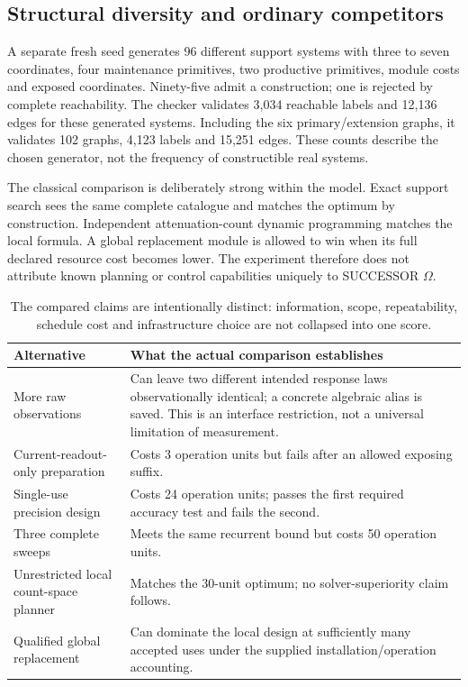 \documentclass[11pt,letterpaper]{article}
\theoremstyle{definition}\newtheorem{definition}[theorem]{Definition}
\theoremstyle{remark}\newtheorem{remark}[theorem]{Remark}
\newcommand{\Om}{SUCCESSOR $\Omega$}
\begin{document}
\subsection{Structural diversity and ordinary competitors}
A separate fresh seed generates 96 different support systems with three to seven coordinates, four maintenance primitives, two productive primitives, module costs and exposed coordinates. Ninety-five admit a construction; one is rejected by complete reachability. The checker validates 3,034 reachable labels and 12,136 edges for these generated systems. Including the six primary/extension graphs, it validates 102 graphs, 4,123 labels and 15,251 edges. These counts describe the chosen generator, not the frequency of constructible real systems.

The classical comparison is deliberately strong within the model. Exact support search sees the same complete catalogue and matches the optimum by construction. Independent attenuation-count dynamic programming matches the local formula. A global replacement module is allowed to win when its full declared resource cost becomes lower. The experiment therefore does not attribute known planning or control capabilities uniquely to \Om.

\begin{table}[htbp]
\centering\small
\begin{tabularx}{\linewidth}{P{3.8cm}Y}
\toprule
Alternative & What the actual comparison establishes\\
\midrule
More raw observations & Can leave two different intended response laws observationally identical; a concrete algebraic alias is saved. This is an interface restriction, not a universal limitation of measurement.\\
Current-readout-only preparation & Costs 3 operation units but fails after an allowed exposing suffix.\\
Single-use precision design & Costs 24 operation units; passes the first required accuracy test and fails the second.\\
Three complete sweeps & Meets the same recurrent bound but costs 50 operation units.\\
Unrestricted local count-space planner & Matches the 30-unit optimum; no solver-superiority claim follows.\\
Qualified global replacement & Can dominate the local design at sufficiently many accepted uses under the supplied installation/operation accounting.\\
\bottomrule
\end{tabularx}
\caption{The compared claims are intentionally distinct: information, scope, repeatability, schedule cost and infrastructure choice are not collapsed into one score.}
\label{tab:comparators}
\end{table}
\end{document}
